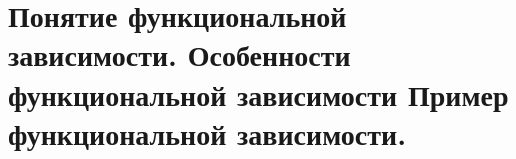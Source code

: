 {
	\section{Понятие функциональной зависимости. Особенности функциональной зависимости Пример функциональной зависимости.}
	\newpage
}
